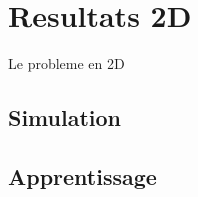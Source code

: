 
% 

\section{Resultats 2D}
Le probleme en 2D

\subsection{Simulation}

\subsection{Apprentissage}

% 
